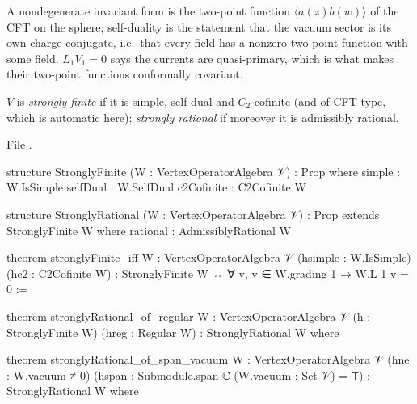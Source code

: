 \begin{physics}
A nondegenerate invariant form is the two-point function $\langle a(z)b(w)\rangle$ of the CFT on the sphere; self-duality
is the statement that the vacuum sector is its own charge conjugate, i.e.\ that every field has a nonzero two-point
function with some field. $L_1V_1 = 0$ says the currents are quasi-primary, which is what makes their two-point functions
conformally covariant.
\end{physics}

\begin{definition}\label{l12:def:strong}
$V$ is \emph{strongly finite} if it is simple, self-dual and $C_2$-cofinite (and of CFT type, which is automatic here);
\emph{strongly rational} if moreover it is admissibly rational.
\end{definition}
\noindent File .
\begin{leancode}
structure StronglyFinite (W : VertexOperatorAlgebra 𝒱) : Prop where
  simple : W.IsSimple
  selfDual : W.SelfDual
  c2Cofinite : C2Cofinite W

structure StronglyRational (W : VertexOperatorAlgebra 𝒱) : Prop extends StronglyFinite W where
  rational : AdmissiblyRational W

theorem stronglyFinite_iff {W : VertexOperatorAlgebra 𝒱} (hsimple : W.IsSimple)
    (hc2 : C2Cofinite W) :
    StronglyFinite W ↔ ∀ v, v ∈ W.grading 1 → W.L 1 v = 0 :=

theorem stronglyRational_of_regular {W : VertexOperatorAlgebra 𝒱} (h : StronglyFinite W)
    (hreg : Regular W) : StronglyRational W where

theorem stronglyRational_of_span_vacuum {W : VertexOperatorAlgebra 𝒱} (hne : W.vacuum ≠ 0)
    (hspan : Submodule.span ℂ ({W.vacuum} : Set 𝒱) = ⊤) : StronglyRational W where
\end{leancode}

